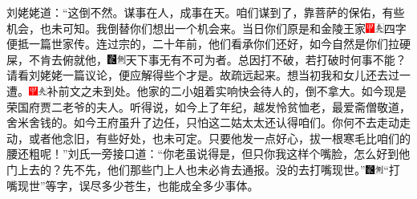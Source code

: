 刘姥姥道：``这倒不然。谋事在人，成事在天。咱们谋到了，靠菩萨的保佑，有些机会，也未可知。我倒替你们想出一个机会来。当日你们原是和金陵王家{\includegraphics[width=3mm]{../Images/00002}\includegraphics[width=3mm]{../Images/00012}\footnotesize \kaishu 四字便抵一篇世家传。}连过宗的，二十年前，他们看承你们还好，如今自然是你们拉硬屎，不肯去俯就他，{\includegraphics[width=3mm]{../Images/00006}\includegraphics[width=3mm]{../Images/00011}\footnotesize \kaishu 天下事无有不可为者。总因打不破，若打破时何事不能？请看刘姥姥一篇议论，便应解得些个才是。}故疏远起来。想当初我和女儿还去过一遭。{\includegraphics[width=3mm]{../Images/00002}\includegraphics[width=3mm]{../Images/00012}\footnotesize \kaishu 补前文之未到处。}他家的二小姐着实响快会待人的，倒不拿大。如今现是荣国府贾二老爷的夫人。听得说，如今上了年纪，越发怜贫恤老，最爱斋僧敬道，舍米舍钱的。如今王府虽升了边任，只怕这二姑太太还认得咱们。你何不去走动走动，或者他念旧，有些好处，也未可定。只要他发一点好心，拔一根寒毛比咱们的腰还粗呢！''刘氏一旁接口道：``你老虽说得是，但只你我这样个嘴脸，怎么好到他门上去的？先不先，他们那些门上人也未必肯去通报。没的去打嘴现世。''{\includegraphics[width=3mm]{../Images/00006}\includegraphics[width=3mm]{../Images/00011}\footnotesize \kaishu ``打嘴现世''等字，误尽多少苍生，也能成全多少事体。}

